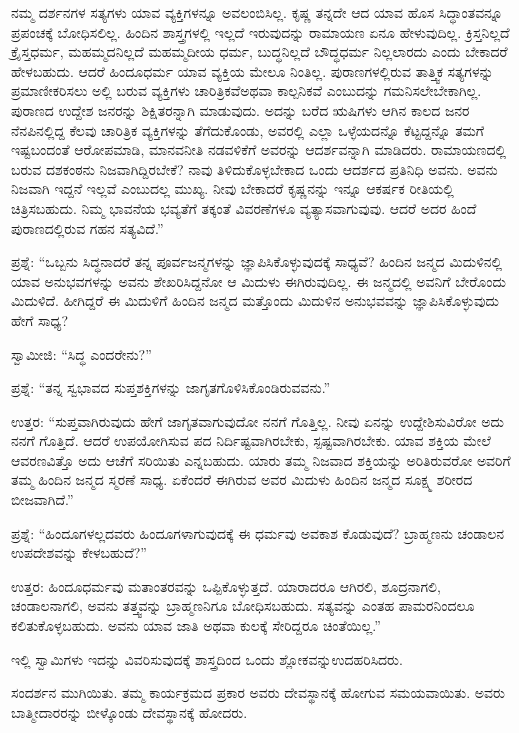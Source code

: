 ನಮ್ಮ ದರ್ಶನಗಳ ಸತ್ಯಗಳು ಯಾವ ವ್ಯಕ್ತಿಗಳನ್ನೂ ಅವಲಂಬಿಸಿಲ್ಲ. ಕೃಷ್ಣ ತನ್ನದೇ ಆದ ಯಾವ ಹೊಸ ಸಿದ್ಧಾಂತವನ್ನೂ ಪ್ರಪಂಚಕ್ಕೆ ಬೋಧಿಸಲಿಲ್ಲ. ಹಿಂದಿನ ಶಾಸ್ತ್ರಗಳಲ್ಲಿ ಇಲ್ಲದೆ ಇರುವುದನ್ನು ರಾಮಾಯಣ ಏನೂ ಹೇಳುವುದಿಲ್ಲ. ಕ್ರಿಸ್ತನಿಲ್ಲದೆ ಕ್ರೈಸ್ತಧರ್ಮ, ಮಹಮ್ಮದನಿಲ್ಲದೆ ಮಹಮ್ಮದೀಯ ಧರ್ಮ, ಬುದ್ಧನಿಲ್ಲದೆ ಬೌದ್ಧಧರ್ಮ ನಿಲ್ಲಲಾರದು ಎಂದು ಬೇಕಾದರೆ ಹೇಳಬಹುದು. ಆದರೆ ಹಿಂದೂಧರ್ಮ ಯಾವ ವ್ಯಕ್ತಿಯ ಮೇಲೂ ನಿಂತಿಲ್ಲ. ಪುರಾಣಗಳಲ್ಲಿರುವ ತಾತ್ತ್ವಿಕ ಸತ್ಯಗಳನ್ನು ಪ್ರಮಾಣೀಕರಿಸಲು ಅಲ್ಲಿ ಬರುವ ವ್ಯಕ್ತಿಗಳು ಚಾರಿತ್ರಿಕವೆ\break ಅಥವಾ ಕಾಲ್ಪನಿಕವೆ ಎಂಬುದನ್ನು ಗಮನಿಸಲೇಬೇಕಾಗಿಲ್ಲ. ಪುರಾಣದ ಉದ್ದೇಶ ಜನರನ್ನು ಶಿಕ್ಷಿತರನ್ನಾಗಿ ಮಾಡುವುದು. ಅದನ್ನು ಬರೆದ ಋಷಿಗಳು ಆಗಿನ ಕಾಲದ ಜನರ ನೆನಪಿನಲ್ಲಿದ್ದ ಕೆಲವು ಚಾರಿತ್ರಿಕ ವ್ಯಕ್ತಿಗಳನ್ನು ತೆಗೆದುಕೊಂಡು, ಅವರಲ್ಲಿ ಎಲ್ಲಾ ಒಳ್ಳೆಯದನ್ನೊ ಕೆಟ್ಟದ್ದನ್ನೊ ತಮಗೆ ಇಷ್ಟಬಂದಂತೆ ಆರೋಪಮಾಡಿ, ಮಾನವನೀತಿ ನಡವಳಿಕೆಗೆ ಅವರನ್ನು ಆದರ್ಶವನ್ನಾಗಿ ಮಾಡಿದರು. ರಾಮಾಯಣದಲ್ಲಿ ಬರುವ ದಶಕಂಠನು ನಿಜವಾಗಿದ್ದಿರಬೇಕೆ? ನಾವು ತಿಳಿದುಕೊಳ್ಳಬೇಕಾದ ಒಂದು ಆದರ್ಶದ ಪ್ರತಿನಿಧಿ ಅವನು. ಅವನು ನಿಜವಾಗಿ ಇದ್ದನೆ ಇಲ್ಲವೆ ಎಂಬುದಲ್ಲ ಮುಖ್ಯ. ನೀವು ಬೇಕಾದರೆ ಕೃಷ್ಣನನ್ನು ಇನ್ನೂ ಆಕರ್ಷಕ ರೀತಿಯಲ್ಲಿ ಚಿತ್ರಿಸಬಹುದು. ನಿಮ್ಮ ಭಾವನೆಯ ಭವ್ಯತೆಗೆ ತಕ್ಕಂತೆ ವಿವರಣೆಗಳೂ ವ್ಯತ್ಯಾಸವಾಗುವುವು. ಆದರೆ ಅದರ ಹಿಂದೆ ಪುರಾಣದಲ್ಲಿರುವ ಗಹನ ಸತ್ಯವಿದೆ.”

ಪ್ರಶ್ನೆ: “ಒಬ್ಬನು ಸಿದ್ಧನಾದರೆ ತನ್ನ ಪೂರ್ವಜನ್ಮಗಳನ್ನು ಜ್ಞಾಪಿಸಿಕೊಳ್ಳುವುದಕ್ಕೆ ಸಾಧ್ಯವೆ? ಹಿಂದಿನ ಜನ್ಮದ ಮಿದುಳಿನಲ್ಲಿ ಯಾವ ಅನುಭವಗಳನ್ನು ಅವನು ಶೇಖರಿಸಿದ್ದನೋ ಆ ಮಿದುಳು ಈಗಿರುವುದಿಲ್ಲ. ಈ ಜನ್ಮದಲ್ಲಿ ಅವನಿಗೆ ಬೇರೊಂದು ಮಿದುಳಿದೆ. ಹೀಗಿದ್ದರೆ ಈ ಮಿದುಳಿಗೆ ಹಿಂದಿನ ಜನ್ಮದ ಮತ್ತೊಂದು ಮಿದುಳಿನ ಅನುಭವವನ್ನು ಜ್ಞಾಪಿಸಿಕೊಳ್ಳುವುದು ಹೇಗೆ ಸಾಧ್ಯ?

ಸ್ವಾಮೀಜಿ: “ಸಿದ್ಧ ಎಂದರೇನು?”

ಪ್ರಶ್ನೆ: “ತನ್ನ ಸ್ವಭಾವದ ಸುಪ್ತಶಕ್ತಿಗಳನ್ನು ಜಾಗೃತಗೊಳಿಸಿಕೊಂಡಿರುವವನು.”

ಉತ್ತರ: “ಸುಪ್ತವಾಗಿರುವುದು ಹೇಗೆ ಜಾಗೃತವಾಗುವುದೋ ನನಗೆ ಗೊತ್ತಿಲ್ಲ. ನೀವು ಏನನ್ನು ಉದ್ದೇಶಿಸುವಿರೋ ಅದು ನನಗೆ ಗೊತ್ತಿದೆ. ಆದರೆ ಉಪಯೋಗಿಸುವ ಪದ ನಿರ್ದಿಷ್ಟವಾಗಿರಬೇಕು, ಸ್ಪಷ್ಟವಾಗಿರಬೇಕು. ಯಾವ ಶಕ್ತಿಯ ಮೇಲೆ ಆವರಣವಿತ್ತೊ ಅದು ಆಚೆಗೆ ಸರಿಯಿತು ಎನ್ನಬಹುದು. ಯಾರು ತಮ್ಮ ನಿಜವಾದ ಶಕ್ತಿಯನ್ನು ಅರಿತಿರುವರೋ ಅವರಿಗೆ ತಮ್ಮ ಹಿಂದಿನ ಜನ್ಮದ ಸ್ಮರಣೆ ಸಾಧ್ಯ. ಏಕೆಂದರೆ ಈಗಿರುವ ಅವರ ಮಿದುಳು ಹಿಂದಿನ ಜನ್ಮದ ಸೂಕ್ಷ್ಮ ಶರೀರದ ಬೀಜವಾಗಿದೆ.”

ಪ್ರಶ್ನೆ: “ಹಿಂದೂಗಳಲ್ಲದವರು ಹಿಂದೂಗಳಾಗುವುದಕ್ಕೆ ಈ ಧರ್ಮವು ಅವಕಾಶ ಕೊಡುವುದೆ? ಬ್ರಾಹ್ಮಣನು ಚಂಡಾಲನ ಉಪದೇಶವನ್ನು ಕೇಳಬಹುದೆ?”

ಉತ್ತರ: ಹಿಂದೂಧರ್ಮವು ಮತಾಂತರವನ್ನು ಒಪ್ಪಿಕೊಳ್ಳುತ್ತದೆ. ಯಾರಾದರೂ ಆಗಿರಲಿ, ಶೂದ್ರನಾಗಲಿ, ಚಂಡಾಲನಾಗಲಿ, ಅವನು ತತ್ತ್ವವನ್ನು ಬ್ರಾಹ್ಮಣನಿಗೂ ಬೋಧಿಸಬಹುದು. ಸತ್ಯವನ್ನು ಎಂತಹ ಪಾಮರನಿಂದಲೂ ಕಲಿತುಕೊಳ್ಳಬಹುದು. ಅವನು ಯಾವ ಜಾತಿ ಅಥವಾ ಕುಲಕ್ಕೆ ಸೇರಿದ್ದರೂ ಚಿಂತೆಯಿಲ್ಲ.”

ಇಲ್ಲಿ ಸ್ವಾಮಿಗಳು ಇದನ್ನು ವಿವರಿಸುವುದಕ್ಕೆ ಶಾಸ್ತ್ರದಿಂದ ಒಂದು ಶ್ಲೋಕವನ್ನು\break ಉದಹರಿಸಿದರು.

ಸಂದರ್ಶನ ಮುಗಿಯಿತು. ತಮ್ಮ ಕಾರ್ಯಕ್ರಮದ ಪ್ರಕಾರ ಅವರು ದೇವಸ್ಥಾನಕ್ಕೆ ಹೋಗುವ ಸಮಯವಾಯಿತು. ಅವರು ಬಾತ್ಮೀದಾರರನ್ನು ಬೀಳ್ಕೊಂಡು ದೇವಸ್ಥಾನಕ್ಕೆ ಹೋದರು.

